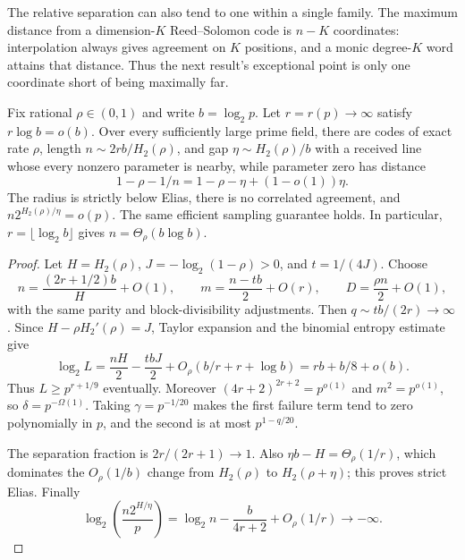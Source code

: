 The relative separation can also tend to one within a single family.
The maximum distance from a dimension-$K$ Reed--Solomon code is
$n-K$ coordinates: interpolation always gives agreement on $K$
positions, and a monic degree-$K$ word attains that distance. Thus
the next result's exceptional point is only one coordinate short of
being maximally far.

\begin{corollary}\label{pd:full-gap}
Fix rational $\rho\in(0,1)$ and write $b=\log_2p$. Let
$r=r(p)\to\infty$ satisfy $r\log b=o(b)$.
Over every sufficiently large prime field, there are codes of exact
rate $\rho$, length $n\sim2rb/H_2(\rho)$, and gap
$\eta\sim H_2(\rho)/b$ with a received line whose every nonzero
parameter is nearby, while parameter zero has distance
\[
 1-\rho-1/n
 =1-\rho-\eta+(1-o(1))\eta.
\]
The radius is strictly below Elias, there is no correlated agreement,
and $n2^{H_2(\rho)/\eta}=o(p)$. The same efficient sampling guarantee
holds. In particular, $r=\lfloor\log_2b\rfloor$ gives
$n=\Theta_\rho(b\log b)$.
\end{corollary}
\begin{proof}
Let $H=H_2(\rho)$, $J=-\log_2(1-\rho)>0$, and $t=1/(4J)$. Choose
\[
 n=\frac{(2r+1/2)b}{H}+O(1),\qquad
 m=\frac{n-tb}{2}+O(r),\qquad D=\frac{\rho n}{2}+O(1),
\]
with the same parity and block-divisibility adjustments. Then
$q\sim tb/(2r)\to\infty$. Since $H-\rho H_2'(\rho)=J$, Taylor
expansion and the binomial entropy estimate give
\[
 \log_2 L
 =\frac{nH}{2}-\frac{tbJ}{2}
   +O_\rho(b/r+r+\log b)
 =rb+b/8+o(b).
\]
Thus $L\ge p^{r+1/9}$ eventually. Moreover
$(4r+2)^{2r+2}=p^{o(1)}$ and $m^2=p^{o(1)}$, so
$\delta=p^{-\Omega(1)}$. Taking $\gamma=p^{-1/20}$ makes the first
failure term tend to zero polynomially in $p$, and the second is at
most $p^{1-q/20}$.

The separation fraction is $2r/(2r+1)\to1$. Also
$\eta b-H=\Theta_\rho(1/r)$, which dominates the
$O_\rho(1/b)$ change from $H_2(\rho)$ to $H_2(\rho+\eta)$;
this proves strict Elias. Finally
\[
 \log_2\left(\frac{n2^{H/\eta}}p\right)
 =\log_2n-\frac{b}{4r+2}+O_\rho(1/r)\longrightarrow-\infty.
\]
\end{proof}

